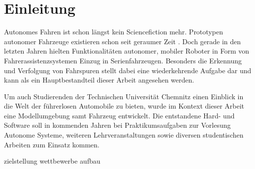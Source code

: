 \chapter{Einleitung \dcsecondauthorshort}

Autonomes Fahren ist schon längst kein Sciencefiction mehr. Prototypen autonomer Fahrzeuge existieren schon seit geraumer Zeit \autocite{kroegerAutomatisierteFahrenIm2015}. Doch gerade in den letzten Jahren hielten Funktionalitäten autonomer, mobiler Roboter in Form von Fahrerassistenzsystemen Einzug in Serienfahrzeugen. Besonders die Erkennung und Verfolgung von Fahrspuren stellt dabei eine wiederkehrende Aufgabe dar \autocite{kunzeReadingLanesRoad2018, naroteReviewRecentAdvances2018} und kann als ein Hauptbestandteil dieser Arbeit angesehen werden. 

Um auch Studierenden der Technischen Universität Chemnitz einen Einblick in die Welt der führerlosen Automobile zu bieten, wurde im Kontext dieser Arbeit eine Modellumgebung samt Fahrzeug entwickelt. Die entstandene Hard- und Software soll in kommenden Jahren bei Praktikumsaufgaben zur Vorlesung \glqq Autonome Systeme\grqq{}, weiteren Lehrveranstaltungen sowie diversen studentischen Arbeiten zum Einsatz kommen. 

{zielstellung}
{wettbewerbe}
{aufbau}